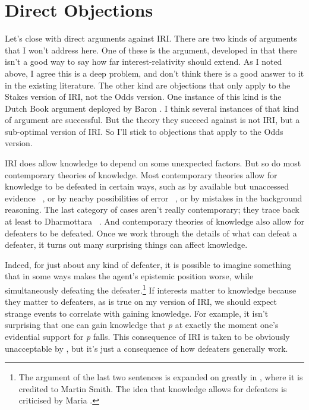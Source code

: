 \section{Direct Objections}
\label{directobjections}

Let's close with direct arguments against IRI. There are two kinds of arguments that I won't address here. One of these is the argument, developed in  \citet{IchikawaEtAl2012} that there isn't a good way to say how far interest-relativity should extend. As I noted above, I agree this is a deep problem, and don't think there is a good answer to it in the existing literature. The other kind are objections that only apply to the Stakes version of IRI, not the Odds version. One instance of this kind is the Dutch Book argument deployed by Baron  \citet{Reed2014}. I think several instances of that kind of argument are successful. But the theory they succeed against is not IRI, but a sub-optimal version of IRI. So I'll stick to objections that apply to the Odds version.

IRI does allow knowledge to depend on some unexpected factors. But so do most contemporary theories of knowledge. Most contemporary theories allow for knowledge to be defeated in certain ways, such as by available but unaccessed evidence ~\citep[75]{Harman1973}, or by nearby possibilities of error ~\citep{Goldman1976}, or by mistakes in the background reasoning. The last category of cases aren't really contemporary; they trace back at least to Dharmottara ~\citep[58]{Nagel2014}. And contemporary theories of knowledge also allow for defeaters to be defeated. Once we work through the details of what can defeat a defeater, it turns out many surprising things can affect knowledge.

Indeed, for just about any kind of defeater, it is possible to imagine something that in some ways makes the agent's epistemic position worse, while simultaneously defeating the defeater.\footnote{The argument of the last two sentences is expanded on greatly in  \citet[§3]{Weatherson2014-ProbScept}, where it is credited to Martin Smith. The idea that knowledge allows for defeaters is criticised by Maria  \citet{Lasonen-Aarnio2014}.} If interests matter to knowledge because they matter to defeaters, as is true on my version of IRI, we should expect strange events to correlate with gaining knowledge. For example, it isn't surprising that one can gain knowledge that \emph{p} at exactly the moment one's evidential support for \emph{p} falls. This consequence of IRI is taken to be obviously unacceptable by  \citet{EatonPickavance2015}, but it's just a consequence of how defeaters generally work.

